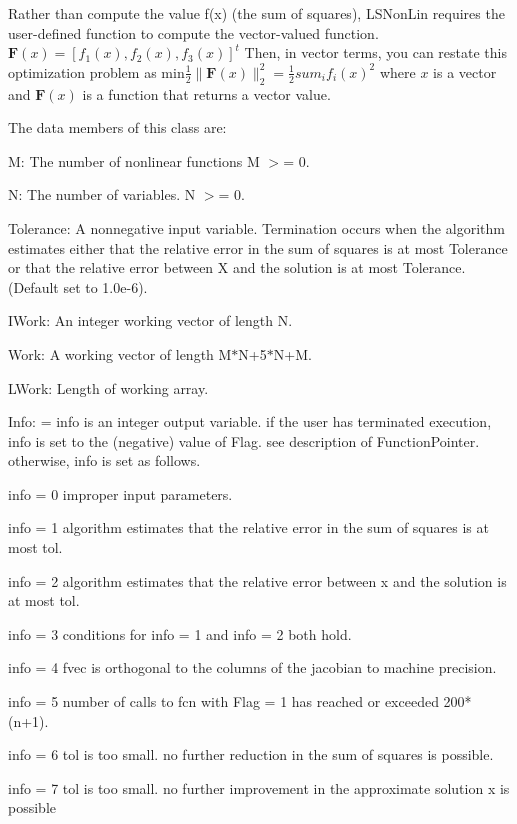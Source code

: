 Rather than compute the value f(x) (the sum of squares), L\-S\-Non\-Lin requires the user-\/defined function to compute the vector-\/valued function. $ \textbf{F}(x) = [f_1(x), f_2(x), f_3(x)]^{t} $ Then, in vector terms, you can restate this optimization problem as $ \mbox{min} \frac{1}{2} \| \textbf{F}(x) \|_2^2 = \frac{1}{2} sum_i f_i(x)^2 $ where $x$ is a vector and $\textbf{F}(x)$ is a function that returns a vector value.

The data members of this class are\-:


\begin{DoxyItemize}
\item M\-: The number of nonlinear functions M $>$= 0.
\item N\-: The number of variables. N $>$= 0.
\item Tolerance\-: A nonnegative input variable. Termination occurs when the algorithm estimates either that the relative error in the sum of squares is at most Tolerance or that the relative error between X and the solution is at most Tolerance. (Default set to 1.\-0e-\/6).
\item I\-Work\-: An integer working vector of length N.
\item Work\-: A working vector of length M$\ast$\-N+5$\ast$\-N+\-M.
\item L\-Work\-: Length of working array.
\item Info\-: = info is an integer output variable. if the user has terminated execution, info is set to the (negative) value of Flag. see description of Function\-Pointer. otherwise, info is set as follows. \begin{DoxyVerb}info = 0  improper input parameters.

info = 1  algorithm estimates that the relative error
          in the sum of squares is at most tol.

info = 2  algorithm estimates that the relative error
          between x and the solution is at most tol.

info = 3  conditions for info = 1 and info = 2 both hold.

info = 4  fvec is orthogonal to the columns of the
          jacobian to machine precision.

info = 5  number of calls to fcn with Flag = 1 has 
      reached or exceeded 200*(n+1).

info = 6  tol is too small. no further reduction in
          the sum of squares is possible.

info = 7  tol is too small. no further improvement in
          the approximate solution x is possible
\end{DoxyVerb}

\end{DoxyItemize}

